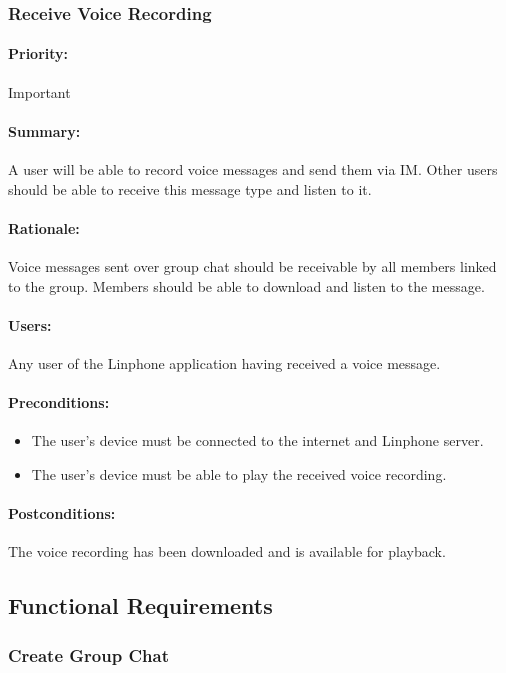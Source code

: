 \documentclass[11pt]{article}
\begin{document}
\subsubsection{Receive Voice Recording} \label{UC-receive-voice}
\paragraph{Priority:} Important
\paragraph{Summary:} A user will be able to record voice messages and send them via IM. Other users should be able to receive this message type and listen to it.
\paragraph{Rationale:} Voice messages sent over group chat should be receivable by all members linked to the group. Members should be able to download and listen to the message.
\paragraph{Users:} Any user of the Linphone application having received a voice message.
\paragraph{Preconditions:} 
\begin{itemize}
\item The user's device must be connected to the internet and Linphone server.
\item The user's device must be able to play the received voice recording.
\end{itemize}
\paragraph{{Postconditions:}} The voice recording has been downloaded and is available for playback.

\newpage

\subsection{Functional Requirements}
\subsubsection{Create Group Chat} \label{FR-create-group}
\end{document}
